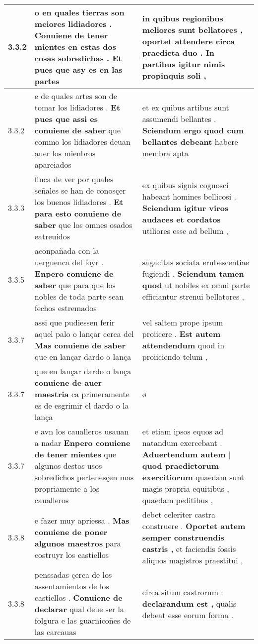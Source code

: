 \begin{tabular}{|p{1cm}|p{6.5cm}|p{6.5cm}|}
3.3.2 & o en quales tierras son meiores lidiadores . \textbf{ Conuiene de tener mientes en estas dos cosas sobredichas . } Et pues que asy es en las partes & in quibus regionibus meliores sunt bellatores , \textbf{ oportet attendere circa praedicta duo . } In partibus igitur nimis propinquis soli , \\\hline
3.3.2 & e de quales artes son de tomar los lidiadores . \textbf{ Et pues que assi es conuiene de saber } que commo los lidiadores deuan auer los mienbros apareiados & et ex quibus artibus sunt assumendi bellantes . \textbf{ Sciendum ergo quod cum bellantes debeant } habere membra apta \\\hline
3.3.3 & finca de ver por quales señales se han de conosçer los buenos lidiadores . \textbf{ Et para esto conuiene de saber } que los omnes osados eatreuidos & ex quibus signis cognosci habeant homines bellicosi . \textbf{ Sciendum igitur viros audaces et cordatos } utiliores esse ad bellum , \\\hline
3.3.5 & aconpañada con la uerguenca del foyr . \textbf{ Enpero conuiene de saber } que para que los nobles de toda parte sean fechos estremados & sagacitas sociata erubescentiae fugiendi . \textbf{ Sciendum tamen quod } ut nobiles ex omni parte efficiantur strenui bellatores , \\\hline
3.3.7 & assi que pudiessen ferir aquel palo o lançar cerca del \textbf{ Mas conuiene de saber } que en lançar dardo o lança & vel saltem prope ipsum proiicere . \textbf{ Est autem attendendum } quod in proiiciendo telum , \\\hline
3.3.7 & que en lançar dardo o lança \textbf{ conuiene de auer maestria } ca primeramente es de esgrimir el dardo o la lança & ø \\\hline
3.3.7 & e avn los caualleros usauan a nadar \textbf{ Enpero conuiene de tener mientes } que algunos destos usos sobredichos pertenesçen mas propriamente a los caualleros & et etiam ipsos equos ad natandum exercebant . \textbf{ Aduertendum autem | quod praedictorum exercitiorum } quaedam sunt magis propria equitibus , quaedam peditibus , \\\hline
3.3.8 & e fazer muy apriessa . \textbf{ Mas conuiene de poner algunos maestros } para costruyr los castiellos & debet celeriter castra construere . \textbf{ Oportet autem semper construendis castris , } et faciendis fossis aliquos magistros praestitui , \\\hline
3.3.8 & penssadas çerca de los assentamientos de los castiellos . \textbf{ Conuiene de declarar } qual deue ser la folgura e las guarnicoñes de las carcauas & circa situm castrorum : \textbf{ declarandum est , } qualis debeat esse eorum forma . \\\hline

\end{tabular}
